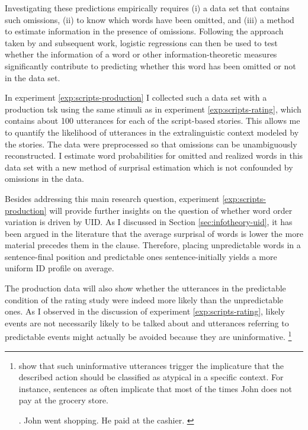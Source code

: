 Investigating these predictions empirically requires (i) a data set that contains such omissions, (ii) to know  which words have been omitted, and (iii) a method to estimate information in the presence of omissions. Following the approach taken by \citet{levy.jaeger2007} and subsequent work, logistic regressions can then be used to test whether the information of a word or other information-theoretic measures significantly contribute to predicting whether this word has been omitted or not in the data set.

In experiment \ref{exp:scripts-production} I collected such a data set with a production tsk using the same stimuli as in experiment \ref{exp:scripts-rating}, which contains about 100 utterances for each of the script-based stories. This allows me to quantify the likelihood of utterances in the extralinguistic context modeled by the stories. The data were preprocessed so that omissions can be unambiguously reconstructed. I estimate word probabilities for omitted and realized words in this data set with  a new method of surprisal estimation which is not confounded by omissions in the data.

Besides addressing this main research question, experiment \ref{exp:scripts-production} will provide further insights on the question of whether word order variation is driven by UID. As I discussed in Section \ref{sec:infotheory-uid}, it has been argued in the literature that the average surprisal of words is lower the more material precedes them in the clause. Therefore, placing unpredictable words in a sentence-final position and predictable ones sentence-initially yields a more uniform ID profile on average. 

The production data will also show whether the utterances in the predictable condition of the rating study were indeed more likely than the unpredictable ones. As I observed in the discussion of experiment \ref{exp:scripts-rating}, likely events are not necessarily likely to be talked about and utterances referring to predictable events might actually be avoided because they are uninformative.%
%
\footnote{\citet{kravtchenko.demberg2015} show that such uninformative utterances trigger the implicature that the described action should be classified as atypical in a specific context. For instance, sentences as \Next often implicate that most of the times John does not pay at the grocery store.

\ex. John went shopping. He paid at the cashier. \hfill \citep[1209]{kravtchenko.demberg2015}

}\afterfn%
%

